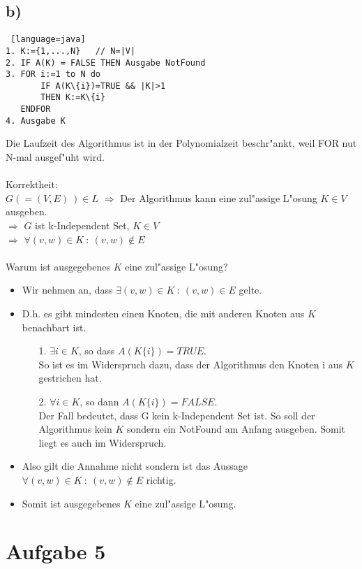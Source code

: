 \documentclass[a4paper,11pt]{scrartcl}
\begin{document}
\subsection*{b)}
\begin{lstlisting} [language=java]
1. K:={1,...,N}   // N=|V|
2. IF A(K) = FALSE THEN Ausgabe NotFound 
3. FOR i:=1 to N do
       IF A(K\{i})=TRUE && |K|>1
       THEN K:=K\{i}
   ENDFOR
4. Ausgabe K	
\end{lstlisting}
Die Laufzeit des Algorithmus ist in der Polynomialzeit beschr"ankt, weil FOR nut N-mal ausgef"uht wird.
\\ \ \\
Korrektheit:\\
$G(=(V,E)\ )\in L$ $\Longrightarrow$ Der Algorithmus kann eine zul"assige L"osung $K\in V$ ausgeben.\\
$\Longrightarrow$ $G$ ist k-Independent Set, $K\in V$\\
$\Longrightarrow$ $\forall (v,w)\in K\ :\ (v,w)\notin E$
\\ \ \\
Warum ist ausgegebenes $K$ eine zul"assige L"osung?
\begin{itemize}
	\item Wir nehmen an, dass $\exists (v,w)\in K\ :\ (v,w)\in E$ gelte.
	\item D.h. es gibt mindesten einen Knoten, die mit anderen Knoten aus $K$ benachbart ist.
		\begin{itemize}
			\item[1.] $\exists i \in K$, so dass $A(K\{i\})=TRUE$.\\
			So ist es im Widerspruch dazu, dass der Algorithmus den Knoten i aus $K$ gestrichen hat.
			\item[2.] $\forall i \in K$, so dann $A(K\{i\})=FALSE$.\\
			Der Fall bedeutet, dass G kein k-Independent Set ist. So soll der Algorithmus kein $K$ sondern ein NotFound am Anfang ausgeben. Somit liegt es auch im Widerspruch.
		\end{itemize}
	\item Also gilt die Annahme nicht sondern ist das Aussage $\forall (v,w)\in K\ :\ (v,w)\notin E$ richtig.
	\item Somit ist ausgegebenes $K$ eine zul"assige L"osung.
\end{itemize}

\section*{Aufgabe 5}
\end{document}
